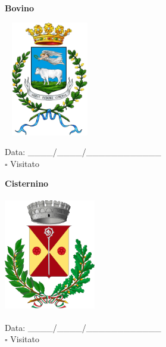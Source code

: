 \documentclass[a5paper,12pt]{article}
\begin{document}
\vspace{0.7cm}

\noindent
\begin{minipage}[t]{0.45\textwidth}
    \begin{center}
        \textbf{Bovino}
    \end{center}
    \vspace{-0.5cm} %
    \begin{center}
        \includegraphics[height= 5cm, width=4cm]{Puglia/Stemma Bovino.png}
    \end{center}
    \vspace{-0.4cm} %
    \begin{flushleft}
        Data: \_\_\_\_/\_\_\_\_/\_\_\_\_\_\_\_\_\_\_\_\_ \\
        $\square$ Visitato
    \end{flushleft}
\end{minipage}
\hfill
\noindent
\begin{minipage}[t]{0.45\textwidth}
    \begin{center}
        \textbf{Cisternino}
    \end{center}
    \vspace{-0.5cm} %
    \begin{center}
        \includegraphics[height= 5cm, width=4cm]{Puglia/Stemma Cisternino.png}
    \end{center}
    \vspace{-0.4cm} %
    \begin{flushleft}
        Data: \_\_\_\_/\_\_\_\_/\_\_\_\_\_\_\_\_\_\_\_\_ \\
        $\square$ Visitato
    \end{flushleft}
\end{minipage}
\end{document}
